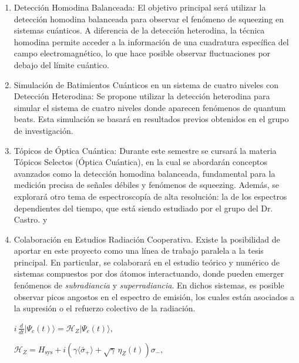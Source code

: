 \documentclass[12pt]{report}
\begin{document}
\begin{enumerate}
    
\item Detección Homodina Balanceada:
El objetivo principal será utilizar la detección homodina 
balanceada para observar el fenómeno de squeezing en sistemas cuánticos. A diferencia de la detección heterodina, la técnica homodina permite acceder a la información de una cuadratura específica del campo electromagnético, lo que hace posible observar fluctuaciones por debajo del límite cuántico.

\item Simulación de Batimientos Cu\'anticos en un sistema de cuatro niveles con Detección Heterodina:
Se propone utilizar la detección heterodina para simular el sistema de cuatro niveles donde aparecen fenómenos de quantum beats. Esta simulación se basará en resultados previos obtenidos en el grupo de investigación.%

\item Tópicos de Óptica Cuántica:
Durante este semestre se cursará la materia Tópicos Selectos 
(Óptica Cuántica), en la cual se abordarán conceptos avanzados como la detección homodina balanceada, fundamental para la medición precisa de señales débiles y fenómenos de squeezing. Además, se explorará otro tema de espectroscopía de alta resolución: la de los espectros dependientes del tiempo, 
que est\'a siendo estudiado por el grupo del Dr. Castro. y

\item Colaboración en Estudios Radiaci\'on Cooperativa. Existe la posibilidad de aportar en este proyecto como una línea de trabajo paralela a la tesis principal. En particular, se colaborará en el estudio teórico y numérico de sistemas compuestos por dos átomos interactuando, donde pueden emerger fenómenos de \textit{subradiancia} y \textit{superradiancia}.  En dichos sistemas, es posible observar picos angostos en el espectro de emisión, los cuales están asociados a la supresión o el refuerzo colectivo de la radiación. 

$i\,\frac{d}{dt}|\Psi_{c}(t)\rangle=\mathcal{H}_{Z}|\Psi_{c}(t)\rangle,$

$\mathcal{H}_{Z}=H_{\text{sys}}+i\left(\gamma\langle\bar{\sigma}_{+}\rangle+\sqrt{\gamma}\,\eta_{Z}(t)\right)\sigma_{-},$




\end{enumerate}
\end{document}
